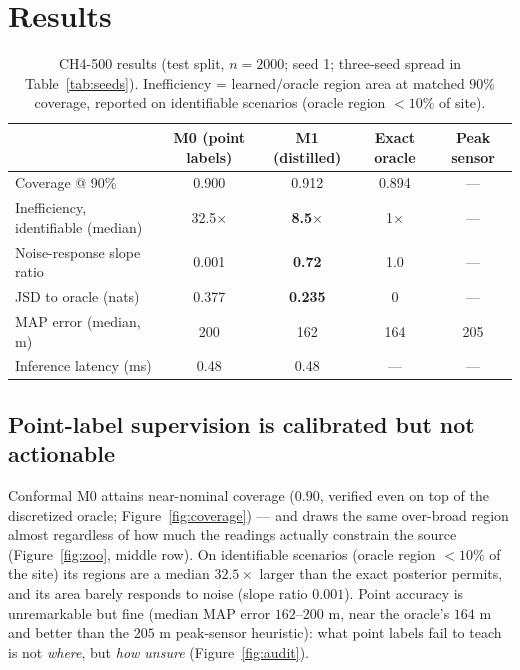 \documentclass{article}
\begin{document}
\section{Results}
\label{sec:results}

\begin{table}[t]
  \caption{CH4-500 results (test split, $n = 2000$; seed 1; three-seed spread in
  Table~\ref{tab:seeds}). Inefficiency = learned$/$oracle region area at matched $90\%$
  coverage, reported on identifiable scenarios (oracle region $<10\%$ of site).}
  \label{tab:headline}
  \centering
  \small
  \begin{tabular}{lcccc}
    \toprule
    & M0 (point labels) & M1 (distilled) & Exact oracle & Peak sensor \\
    \midrule
    Coverage @ 90\% & 0.900 & 0.912 & 0.894 & --- \\
    Inefficiency, identifiable (median) & 32.5$\times$ & \textbf{8.5$\times$} & 1$\times$ & --- \\
    Noise-response slope ratio & 0.001 & \textbf{0.72} & 1.0 & --- \\
    JSD to oracle (nats) & 0.377 & \textbf{0.235} & 0 & --- \\
    MAP error (median, m) & 200 & 162 & 164 & 205 \\
    Inference latency (ms) & 0.48 & 0.48 & --- & --- \\
    \bottomrule
  \end{tabular}
\end{table}

\subsection{Point-label supervision is calibrated but not actionable}
\label{sec:r-m0}

Conformal M0 attains near-nominal coverage ($0.90$, verified even on top of the
discretized oracle; Figure~\ref{fig:coverage}) --- and draws the same over-broad region
almost regardless of how much the readings actually constrain the source
(Figure~\ref{fig:zoo}, middle row). On identifiable scenarios (oracle region $<10\%$ of the
site) its regions are a median $32.5\times$ larger than the exact posterior permits, and
its area barely responds to noise (slope ratio $0.001$). Point accuracy is unremarkable
but fine (median MAP error $162$--$200$ m, near the oracle's $164$ m and better than the
$205$ m peak-sensor heuristic): what point labels fail to teach is not \emph{where}, but
\emph{how unsure} (Figure~\ref{fig:audit}).
\end{document}
